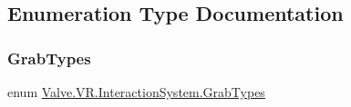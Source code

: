 \subsection{Enumeration Type Documentation}
\mbox{\label{namespace_valve_1_1_v_r_1_1_interaction_system_ae03ab84d315f5997fd000817bfb96a0f}} 
\subsubsection{\texorpdfstring{GrabTypes}{GrabTypes}}
{\footnotesize\ttfamily enum \mbox{\hyperlink{namespace_valve_1_1_v_r_1_1_interaction_system_ae03ab84d315f5997fd000817bfb96a0f}{Valve.\+V\+R.\+Interaction\+System.\+Grab\+Types}}\hspace{0.3cm}{\ttfamily [strong]}}

